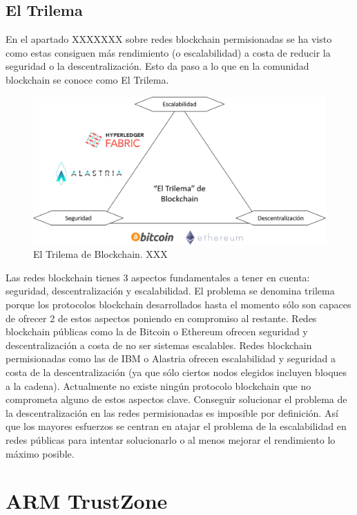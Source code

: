 \subsection{El Trilema}

En el apartado XXXXXXX sobre redes blockchain permisionadas se ha visto como estas consiguen más rendimiento (o escalabilidad) a costa de reducir la seguridad o la descentralización. Esto da paso a lo que en la comunidad blockchain se conoce como El Trilema.

\begin{figure}
	\centering
	\includegraphics[width=1\textwidth]{imagenes/trilemma2.PNG}
	\caption{\label{fig1}El Trilema de Blockchain. XXX}
\end{figure}

Las redes blockchain tienes 3 aspectos fundamentales a tener en cuenta: seguridad, descentralización y escalabilidad. El problema se denomina trilema porque los protocolos blockchain desarrollados hasta el momento sólo son capaces de ofrecer 2 de estos aspectos poniendo en compromiso al restante. Redes blockchain públicas como la de Bitcoin o Ethereum ofrecen seguridad y descentralización a costa de no ser sistemas escalables. Redes blockchain permisionadas como las de IBM o Alastria ofrecen escalabilidad y seguridad a costa de la descentralización (ya que sólo ciertos nodos elegidos incluyen bloques a la cadena).
Actualmente no existe ningún protocolo blockchain que no comprometa alguno de estos aspectos clave. Conseguir solucionar el problema de la descentralización en las redes permisionadas es imposible por definición. Así que los mayores esfuerzos se centran en atajar el problema de la escalabilidad en redes públicas para intentar solucionarlo o al menos mejorar el rendimiento lo máximo posible.



\section{ARM TrustZone}

